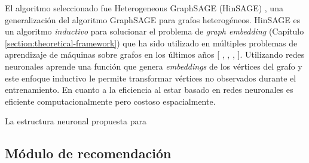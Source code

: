 El algoritmo seleccionado fue Heterogeneous GraphSAGE (HinSAGE) \cite{hinsage}, una generalizaci\'on del
algoritmo GraphSAGE \cite{hamilton2017inductive} para grafos heterog\'eneos. HinSAGE es un algoritmo \textit{inductivo}
para solucionar el problema de \textit{graph embedding} (Cap\'itulo \ref{section:theoretical-framework}) que ha sido
utilizado en m\'ultiples problemas de aprendizaje de m\'aquinas sobre grafos en los \'ultimos a\~nos
[ \cite*{racchi2021fraud}, \cite*{yacoumatos2021trialgraph}, \cite*{cho2022heterogeneous}, \cite*{van2022inductive}].
Utilizando redes neuronales aprende una funci\'on que
genera \textit{embeddings} de los v\'ertices del grafo y este enfoque inductivo le permite transformar v\'ertices
no observados durante el entrenamiento. En cuanto a la eficiencia al estar
basado en redes neuronales es eficiente computacionalmente pero costoso espacialmente.



La estructura neuronal propuesta para 

\subsection{M\'odulo de recomendaci\'on}

